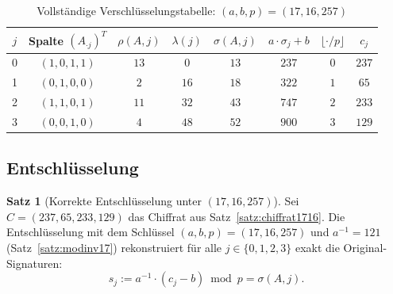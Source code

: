 ﻿\documentclass[a4paper,12pt]{scrreprt}
\theoremstyle{definition}
\newtheorem{satz}{Satz}[section]
\begin{document}
\begin{table}[H]
\centering
\caption{Vollständige Verschlüsselungstabelle: $(a,b,p) = (17,16,257)$}
\label{tab:enc1716}
\begin{tabular}{@{}cccccccc@{}}
\toprule
$j$ & Spalte $(A_{\cdot j})^T$ & $\rho(A,j)$ & $\lambda(j)$ & $\sigma(A,j)$ & $a \cdot \sigma_j + b$ & $\lfloor \cdot / p \rfloor$ & $c_j$ \\
\midrule
0 & $(1,0,1,1)$ & $13$ & $0$  & $13$ & $237$ & $0$ & $237$ \\
1 & $(0,1,0,0)$ & $2$  & $16$ & $18$ & $322$ & $1$ & $65$  \\
2 & $(1,1,0,1)$ & $11$ & $32$ & $43$ & $747$ & $2$ & $233$ \\
3 & $(0,0,1,0)$ & $4$  & $48$ & $52$ & $900$ & $3$ & $129$ \\
\bottomrule
\end{tabular}
\end{table}

\subsection{Entschlüsselung}

\begin{satz}[Korrekte Entschlüsselung unter $(17, 16, 257)$]
\label{satz:dec1716}
Sei $C = (237, 65, 233, 129)$ das Chiffrat aus Satz~\ref{satz:chiffrat1716}. Die Entschlüsselung mit dem Schlüssel $(a, b, p) = (17, 16, 257)$ und $a^{-1} = 121$ (Satz~\ref{satz:modinv17}) rekonstruiert für alle $j \in \{0,1,2,3\}$ exakt die Original-Signaturen:
\[
s_j := a^{-1} \cdot (c_j - b) \bmod p = \sigma(A,j).
\]
\end{satz}
\end{document}
